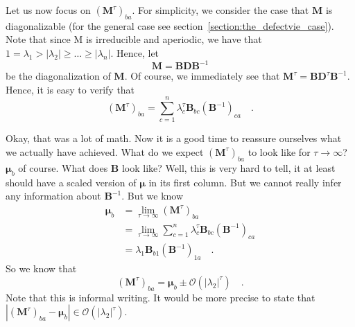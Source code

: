 \documentclass[../../main.tex]{subfiles}
\begin{document}
    Let us now focus on $(\boldsymbol{M}^{\tau})_{ba}$. For simplicity, we consider the case that $\boldsymbol{M}$ is diagonalizable (for the general case see section~\ref{section:the_defectvie_case}). Note that since M is irreducible and aperiodic, we have that $1 = \lambda_1 > |\lambda_2| \geq \dots \geq |\lambda_n|$. Hence, let
    \[
        \boldsymbol{M} = \boldsymbol{BDB}^{-1}
    \]
    be the diagonalization of $\boldsymbol{M}$. Of course, we immediately see that $\boldsymbol{M}^\tau = \boldsymbol{BD}^\tau \boldsymbol{B}^{-1}$. Hence, it is easy to verify that
    \[
        (\boldsymbol{M}^\tau)_{ba} = \sum_{c = 1}^{n} \lambda_c^\tau \boldsymbol{B}_{bc}(\boldsymbol{B}^{-1})_{ca} \quad .
    \]

    \bigskip \noindent
    Okay, that was a lot of math. Now it is a good time to reassure ourselves what we actually have achieved. What do we expect $(\boldsymbol{M}^\tau)_{ba}$ to look like for $\tau \rightarrow \infty$? $\boldsymbol{\mu}_b$ of course. What does $\boldsymbol{B}$ look like? Well, this is very hard to tell, it at least should have a scaled version of $\boldsymbol{\mu}$ in its first column. But we cannot really infer any information about $\boldsymbol{B}^{-1}$. But we know
    \begin{align*}
        \boldsymbol{\mu}_b &= \lim_{\tau \to \infty} (\boldsymbol{M}^\tau)_{ba} \\
        &= \lim_{\tau \to \infty} \sum_{c = 1}^{n} \lambda_c^\tau \boldsymbol{B}_{bc}(\boldsymbol{B}^{-1})_{ca} \\
        &= \lambda_1 \boldsymbol{B}_{b1}(\boldsymbol{B}^{-1})_{1a} \quad .
    \end{align*}
    So we know that
    \[
        (\boldsymbol{M}^\tau)_{ba} = \boldsymbol{\mu}_b \pm \mathcal{O}(|\lambda_2|^\tau) \quad .
    \]
    Note that this is informal writing. It would be more precise to state that $|(\boldsymbol{M}^\tau)_{ba} - \boldsymbol{\mu}_b| \in \mathcal{O}(|\lambda_2|^\tau)$.
\end{document}
